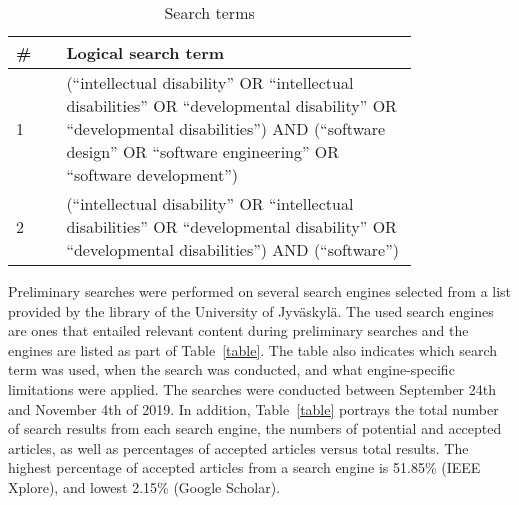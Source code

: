 \documentclass[utf8,english]{gradu3}
\begin{document}
\begin{table}[h!]
  \centering
  \caption{Search terms}
  \label{termit}
  \begin{tabular}{|p{0.1\linewidth}|p{0.7\linewidth}|}
    \hline
    \textbf{\#} & \textbf{Logical search term}                                                                                                                                                                                                                  \\ \hline
    1           & (``intellectual disability'' OR ``intellectual disabilities'' \newline OR ``developmental disability'' OR ``developmental disabilities'') \newline AND (``software design'' OR ``software engineering'' \newline OR ``software development'') \\ \hline
    2           & (``intellectual disability'' OR ``intellectual disabilities'' \newline OR ``developmental disability'' OR ``developmental disabilities'') \newline AND (``software'')                                                                         \\ \hline
  \end{tabular}
\end{table}

Preliminary searches were performed on several search engines selected from a list provided by
the library of the University of Jyväskylä.
The used search engines are ones that entailed relevant content during preliminary searches and the engines are listed
as part of Table~\ref{table}. The table also indicates which search term was used,
when the search was conducted, and what engine-specific limitations were applied.
The searches were conducted between September 24th and November 4th of 2019.
In addition, Table~\ref{table} portrays the total number of search results from each search engine,
the numbers of potential and accepted articles, as well as percentages of accepted articles versus total results.
The highest percentage of accepted articles from a search engine is 51.85\% (IEEE Xplore),
and lowest 2.15\% (Google Scholar).
\end{document}
